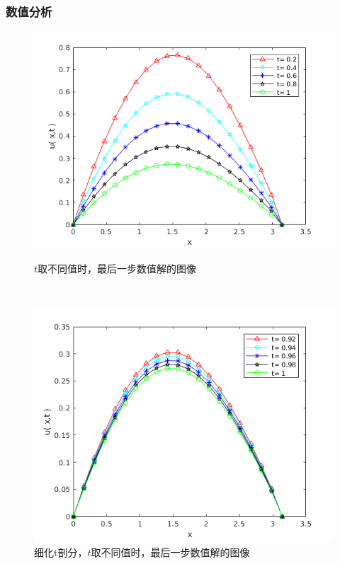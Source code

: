 \documentclass[notheorems,serif]{beamer}
\begin{document}
\begin{frame}
\frametitle{数值分析}
\begin{figure}[h]
	\begin{minipage}[t]{0.4\linewidth}%
		\centering     %
		\includegraphics[width=1.2\textwidth]{t1.png}
		\caption{$t$取不同值时，最后一步数值解的图像}%
		\label{fig:liuchengtu1}%
	\end{minipage} 
	\hfill
	\begin{minipage}[t]{0.4\linewidth}
		\centering
		\includegraphics[width=1.2\textwidth]{t2.png}
		\caption{细化t剖分，$t$取不同值时，最后一步数值解的图像}%
		\label{fig:liuchengtu2}
	\end{minipage}
\end{figure}
\end{frame}
\end{document}
